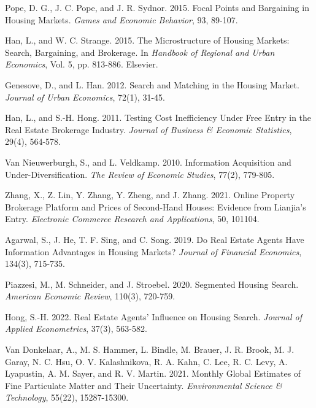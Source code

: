 \documentclass[11pt]{article}
\begin{document}
\begin{singlespace}
\begin{thebibliography}{}
  Pope, D. G., J. C. Pope, and J. R. Sydnor. 2015. Focal Points and Bargaining in Housing Markets. \textit{Games and Economic Behavior}, 93, 89-107.
  
  Han, L., and W. C. Strange. 2015. The Microstructure of Housing Markets: Search, Bargaining, and Brokerage. In \textit{Handbook of Regional and Urban Economics}, Vol. 5, pp. 813-886. Elsevier.
  
  Genesove, D., and L. Han. 2012. Search and Matching in the Housing Market. \textit{Journal of Urban Economics}, 72(1), 31-45.
  
  Han, L., and S.-H. Hong. 2011. Testing Cost Inefficiency Under Free Entry in the Real Estate Brokerage Industry. \textit{Journal of Business \& Economic Statistics}, 29(4), 564-578.
  
  Van Nieuwerburgh, S., and L. Veldkamp. 2010. Information Acquisition and Under-Diversification. \textit{The Review of Economic Studies}, 77(2), 779-805.
  
  Zhang, X., Z. Lin, Y. Zhang, Y. Zheng, and J. Zhang. 2021. Online Property Brokerage Platform and Prices of Second-Hand Houses: Evidence from Lianjia’s Entry. \textit{Electronic Commerce Research and Applications}, 50, 101104.
  
  Agarwal, S., J. He, T. F. Sing, and C. Song. 2019. Do Real Estate Agents Have Information Advantages in Housing Markets? \textit{Journal of Financial Economics}, 134(3), 715-735.
  
  Piazzesi, M., M. Schneider, and J. Stroebel. 2020. Segmented Housing Search. \textit{American Economic Review}, 110(3), 720-759.
  
  Hong, S.-H. 2022. Real Estate Agents' Influence on Housing Search. \textit{Journal of Applied Econometrics}, 37(3), 563-582.
  
  Van Donkelaar, A., M. S. Hammer, L. Bindle, M. Brauer, J. R. Brook, M. J. Garay, N. C. Hsu, O. V. Kalashnikova, R. A. Kahn, C. Lee, R. C. Levy, A. Lyapustin, A. M. Sayer, and R. V. Martin. 2021. Monthly Global Estimates of Fine Particulate Matter and Their Uncertainty. \textit{Environmental Science \& Technology}, 55(22), 15287-15300.
  

\end{thebibliography}
\end{singlespace}
\end{document}
